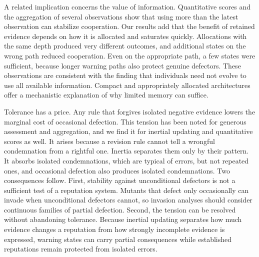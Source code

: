 \documentclass[10pt]{wlscirep}
\theoremstyle{plain}
\theoremstyle{remark}
\begin{document}
A related implication concerns the value of information. Quantitative scores and the aggregation of several observations show that using more than the latest observation can stabilize cooperation\cite{schmid2023,clark2020,michelmata2024}. Our results add that the benefit of retained evidence depends on how it is allocated and saturates quickly. Allocations with the same depth produced very different outcomes, and additional states on the wrong path reduced cooperation. Even on the appropriate path, a few states were sufficient, because longer warning paths also protect genuine defectors. These observations are consistent with the finding that individuals need not evolve to use all available information\cite{michelmata2024}. Compact and appropriately allocated architectures offer a mechanistic explanation of why limited memory can suffice.

Tolerance has a price. Any rule that forgives isolated negative evidence lowers the marginal cost of occasional defection. This tension has been noted for generous assessment\cite{schmid2021} and aggregation\cite{michelmata2024}, and we find it for inertial updating and quantitative scores as well. It arises because a revision rule cannot tell a wrongful condemnation from a rightful one. Inertia separates them only by their pattern. It absorbs isolated condemnations, which are typical of errors, but not repeated ones, and occasional defection also produces isolated condemnations. Two consequences follow. First, stability against unconditional defectors is not a sufficient test of a reputation system. Mutants that defect only occasionally can invade when unconditional defectors cannot, so invasion analyses should consider continuous families of partial defection. Second, the tension can be resolved without abandoning tolerance. Because inertial updating separates how much evidence changes a reputation from how strongly incomplete evidence is expressed, warning states can carry partial consequences while established reputations remain protected from isolated errors.
\end{document}

